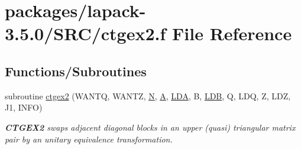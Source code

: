 \hypertarget{ctgex2_8f}{}\section{packages/lapack-\/3.5.0/\+S\+R\+C/ctgex2.f File Reference}
\label{ctgex2_8f}
\subsection*{Functions/\+Subroutines}
\begin{DoxyCompactItemize}
\item 
subroutine \hyperlink{group__complexGEauxiliary_gad1dd22026fefb08f31ddac6b92d8f2b6}{ctgex2} (W\+A\+N\+T\+Q, W\+A\+N\+T\+Z, \hyperlink{polmisc_8c_a0240ac851181b84ac374872dc5434ee4}{N}, \hyperlink{classA}{A}, \hyperlink{example__user_8c_ae946da542ce0db94dced19b2ecefd1aa}{L\+D\+A}, B, \hyperlink{example__user_8c_a50e90a7104df172b5a89a06c47fcca04}{L\+D\+B}, Q, L\+D\+Q, Z, L\+D\+Z, J1, I\+N\+F\+O)
\begin{DoxyCompactList}\small\item\em {\bfseries C\+T\+G\+E\+X2} swaps adjacent diagonal blocks in an upper (quasi) triangular matrix pair by an unitary equivalence transformation. \end{DoxyCompactList}\end{DoxyCompactItemize}
